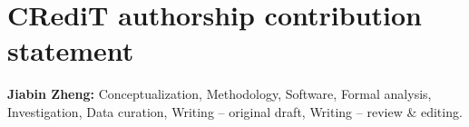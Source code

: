 \documentclass[10pt]{article}
\begin{document}
\section*{CRediT authorship contribution statement}

\textbf{Jiabin Zheng:} Conceptualization, Methodology, Software, Formal
analysis, Investigation, Data curation, Writing -- original draft, Writing --
review \& editing.



\end{document}
